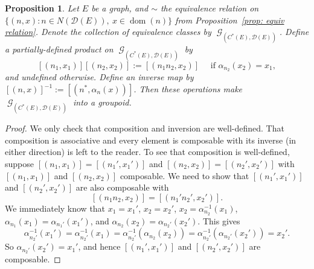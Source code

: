 \documentclass[12pt, a4paper]{amsart}
\numberwithin{equation}{section}
\newtheorem{prop}[thm]{Proposition}
\theoremstyle{definition}
\theoremstyle{remark}
\begin{document}
\begin{prop}\label{prop: the groupoid}
Let $E$ be a graph, and $\sim$ the equivalence relation on $\{(n,x):n\in 
N(\mathcal{D}(E)),\ x\in{{\operatorname{dom}}}(n)\}$ from Proposition~\ref{prop: equiv 
relation}. Denote the collection of equivalence classes by 
${\operatorname{\mathcal{G}}}_{(C^*(E),\mathcal{D}(E))}$. Define a partially-defined product on 
${\operatorname{\mathcal{G}}}_{(C^*(E),\mathcal{D}(E))}$ by 
\[
[(n_1,x_1)][(n_2,x_2)]:=[(n_1n_2, x_2)]\quad\text{ if $\alpha_{n_2}(x_2)=x_1$},
\]
and undefined otherwise. Define an inverse map by 
$[(n,x)]^{-1}:=[(n^*,\alpha_n(x))]$. Then these operations make ${\operatorname{\mathcal{G}}}_{(C^*(E),\mathcal{D}(E))}$ into a
groupoid. 
\end{prop}

\begin{proof}
We only check that composition and inversion are well-defined. That 
composition is associative and every element is composable with its inverse 
(in either direction) is left to the reader. To see that composition is 
well-defined, suppose 
$[(n_1,x_1)]=[(n_1',x_1')]$ and $[(n_2,x_2)]=[(n_2',x_2')]$ with $[(n_1,x_1)]$ 
and $[(n_2,x_2)]$ composable. We need to show that $[(n_1',x_1')]$ and 
$[(n_2',x_2')]$ are also composable with 
\begin{equation}\label{comp_grp}
[(n_1n_2,x_2)]=[(n_1'n_2',x_2')].
\end{equation}
We immediately know that $x_1=x_1'$, $x_2=x_2'$, $x_2=\alpha_{n_2}^{-1}(x_1)$, 
$\alpha_{n_1}(x_1)=\alpha_{n_1'}(x_1')$, and 
$\alpha_{n_2}(x_2)=\alpha_{n_2'}(x_2')$. This gives
\[
\alpha_{n_2'}^{-1}(x_1')=\alpha_{n_2'}^{-1}(x_1)=\alpha_{n_2'}^{-1}(\alpha_{n_2}(x_2))=\alpha_{n_2'}^{-1}(\alpha_{n_2'}(x_2'))=x_2'.
\]
So $\alpha_{n_2'}(x_2')=x_1'$, and hence $[(n_1',x_1')]$ and $[(n_2',x_2')]$ 
are composable.


\end{proof}
\end{document}
